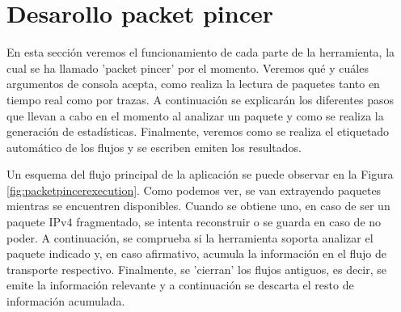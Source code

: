 \section{Desarollo packet pincer}

En esta sección veremos el funcionamiento de cada parte de la herramienta, la cual se ha llamado 'packet pincer' por el momento. Veremos qué y cuáles argumentos de consola acepta, como realiza la lectura de paquetes tanto en tiempo real como por trazas. A continuación se explicarán los diferentes pasos que llevan a cabo en el momento al analizar un paquete y como se realiza la generación de estadísticas. Finalmente, veremos como se realiza el etiquetado automático de los flujos y se escriben emiten los resultados.

Un esquema del flujo principal de la aplicación se puede observar en la Figura \ref{fig:packetpincerexecution}. Como podemos ver, se van extrayendo paquetes mientras se encuentren disponibles. Cuando se obtiene uno, en caso de ser un paquete IPv4 fragmentado, se intenta reconstruir o se guarda en caso de no poder. A continuación, se comprueba si la herramienta soporta analizar el paquete indicado y, en caso afirmativo, acumula la información en el flujo de transporte respectivo. Finalmente, se 'cierran' los flujos antiguos, es decir, se emite la información relevante y a continuación se descarta el resto de información acumulada.

